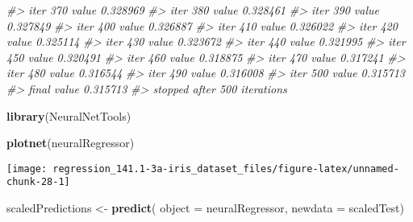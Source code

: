 \documentclass[]{book}
\newenvironment{Shaded}{\begin{snugshade}}{\end{snugshade}}
\newcommand{\CommentTok}[1]{\textcolor[rgb]{0.56,0.35,0.01}{\textit{#1}}}
\newcommand{\DataTypeTok}[1]{\textcolor[rgb]{0.13,0.29,0.53}{#1}}
\newcommand{\KeywordTok}[1]{\textcolor[rgb]{0.13,0.29,0.53}{\textbf{#1}}}
\newcommand{\NormalTok}[1]{#1}
\newcommand{\OperatorTok}[1]{\textcolor[rgb]{0.81,0.36,0.00}{\textbf{#1}}}
\newcommand{\StringTok}[1]{\textcolor[rgb]{0.31,0.60,0.02}{#1}}
\begin{document}
\begin{Shaded}
\begin{Highlighting}[]
\CommentTok{#> iter 370 value 0.328969}
\CommentTok{#> iter 380 value 0.328461}
\CommentTok{#> iter 390 value 0.327849}
\CommentTok{#> iter 400 value 0.326887}
\CommentTok{#> iter 410 value 0.326022}
\CommentTok{#> iter 420 value 0.325114}
\CommentTok{#> iter 430 value 0.323672}
\CommentTok{#> iter 440 value 0.321995}
\CommentTok{#> iter 450 value 0.320491}
\CommentTok{#> iter 460 value 0.318875}
\CommentTok{#> iter 470 value 0.317241}
\CommentTok{#> iter 480 value 0.316544}
\CommentTok{#> iter 490 value 0.316008}
\CommentTok{#> iter 500 value 0.315713}
\CommentTok{#> final  value 0.315713 }
\CommentTok{#> stopped after 500 iterations}
\end{Highlighting}
\end{Shaded}

\begin{Shaded}
\begin{Highlighting}[]
\KeywordTok{library}\NormalTok{(NeuralNetTools)}

\KeywordTok{plotnet}\NormalTok{(neuralRegressor)}
\end{Highlighting}
\end{Shaded}

\begin{center}\texttt{[image: regression\_141.1-3a-iris\_dataset\_files/figure-latex/unnamed-chunk-28-1]} \end{center}

\begin{Shaded}
\begin{Highlighting}[]
\NormalTok{scaledPredictions <-}\StringTok{ }\KeywordTok{predict}\NormalTok{(}
  \DataTypeTok{object =}\NormalTok{ neuralRegressor, }
  \DataTypeTok{newdata =}\NormalTok{ scaledTest)}
\end{Highlighting}
\end{Shaded}

\begin{Shaded}
\end{Shaded}
\end{document}
